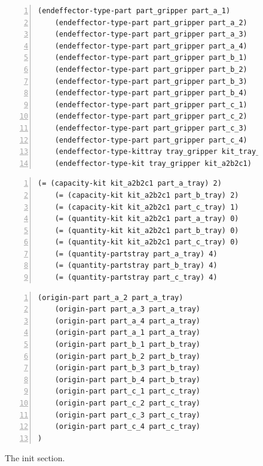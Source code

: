 \begin{figure}[t!h!]
\begin{minipage}{.5\paperwidth}
\begin{mylisting}
\begin{Verbatim}[commandchars=\\\{\},fontsize=\scriptsize,  firstnumber=continue, numbers=left, numbersep=2pt]	
    (endeffector-type-part part_gripper part_a_1)
    (endeffector-type-part part_gripper part_a_2)
    (endeffector-type-part part_gripper part_a_3)
    (endeffector-type-part part_gripper part_a_4)
    (endeffector-type-part part_gripper part_b_1)
    (endeffector-type-part part_gripper part_b_2)
    (endeffector-type-part part_gripper part_b_3)
    (endeffector-type-part part_gripper part_b_4)
    (endeffector-type-part part_gripper part_c_1)
    (endeffector-type-part part_gripper part_c_2)
    (endeffector-type-part part_gripper part_c_3)
    (endeffector-type-part part_gripper part_c_4)
    (endeffector-type-kittray tray_gripper kit_tray_1)
    (endeffector-type-kit tray_gripper kit_a2b2c1)
\end{Verbatim}
\end{mylisting}
\end{minipage}
	
\begin{minipage}{.5\paperwidth}
\begin{mylisting}
\begin{Verbatim}[commandchars=\\\{\},fontsize=\scriptsize,  firstnumber=continue, numbers=left, numbersep=2pt]	
    (= (capacity-kit kit_a2b2c1 part_a_tray) 2)
    (= (capacity-kit kit_a2b2c1 part_b_tray) 2)
    (= (capacity-kit kit_a2b2c1 part_c_tray) 1)
    (= (quantity-kit kit_a2b2c1 part_a_tray) 0)
    (= (quantity-kit kit_a2b2c1 part_b_tray) 0)
    (= (quantity-kit kit_a2b2c1 part_c_tray) 0)
    (= (quantity-partstray part_a_tray) 4)
    (= (quantity-partstray part_b_tray) 4)
    (= (quantity-partstray part_c_tray) 4)
\end{Verbatim}
\end{mylisting}
\end{minipage}
\begin{minipage}{.5\paperwidth}
\begin{mylisting}
\begin{Verbatim}[commandchars=\\\{\},fontsize=\scriptsize,  firstnumber=continue, numbers=left, numbersep=2pt]	
    (origin-part part_a_2 part_a_tray)
    (origin-part part_a_3 part_a_tray)
    (origin-part part_a_4 part_a_tray)
    (origin-part part_a_1 part_a_tray)
    (origin-part part_b_1 part_b_tray)
    (origin-part part_b_2 part_b_tray)
    (origin-part part_b_3 part_b_tray)
    (origin-part part_b_4 part_b_tray)
    (origin-part part_c_1 part_c_tray)
    (origin-part part_c_2 part_c_tray)
    (origin-part part_c_3 part_c_tray)
    (origin-part part_c_4 part_c_tray)
)
\end{Verbatim}
\end{mylisting}
\end{minipage}
\caption{The init section.}
\label{fig:init}
\end{figure}





